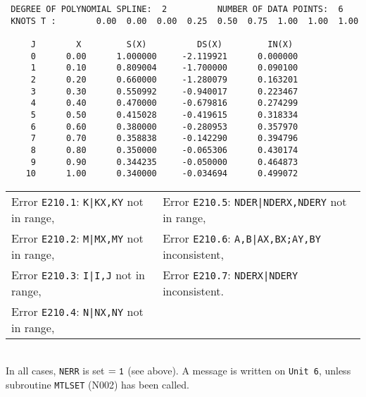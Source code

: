 \begin{verbatim}
 DEGREE OF POLYNOMIAL SPLINE:  2          NUMBER OF DATA POINTS:  6
 KNOTS T :        0.00  0.00  0.00  0.25  0.50  0.75  1.00  1.00  1.00

     J        X         S(X)          DS(X)         IN(X)
     0      0.00      1.000000     -2.119921      0.000000
     1      0.10      0.809004     -1.700000      0.090100
     2      0.20      0.660000     -1.280079      0.163201
     3      0.30      0.550992     -0.940017      0.223467
     4      0.40      0.470000     -0.679816      0.274299
     5      0.50      0.415028     -0.419615      0.318334
     6      0.60      0.380000     -0.280953      0.357970
     7      0.70      0.358838     -0.142290      0.394796
     8      0.80      0.350000     -0.065306      0.430174
     9      0.90      0.344235     -0.050000      0.464873
    10      1.00      0.340000     -0.034694      0.499072
\end{verbatim}
\Errorh
\begin{tabular}{l@{\qquad}l}
Error {\tt E210.1}:  {\tt K|KX,KY} not in range, &
Error {\tt E210.5}:  {\tt NDER|NDERX,NDERY} not in range,  \\
Error {\tt E210.2}:  {\tt M|MX,MY} not in range, &
Error {\tt E210.6}:  {\tt A,B|AX,BX;AY,BY} inconsistent,  \\
Error {\tt E210.3}:  {\tt I|I,J}   not in range, &
Error {\tt E210.7}:  {\tt NDERX|NDERY} inconsistent. \\
Error {\tt E210.4}:  {\tt N|NX,NY} not in range,
\end{tabular} \\[1mm]
In all cases, {\tt NERR} is set ${\tt =1}$ (see above). A message is
written on {\tt Unit 6}, unless subroutine {\tt MTLSET} (N002) has
been called.
\newpage
\Refer
